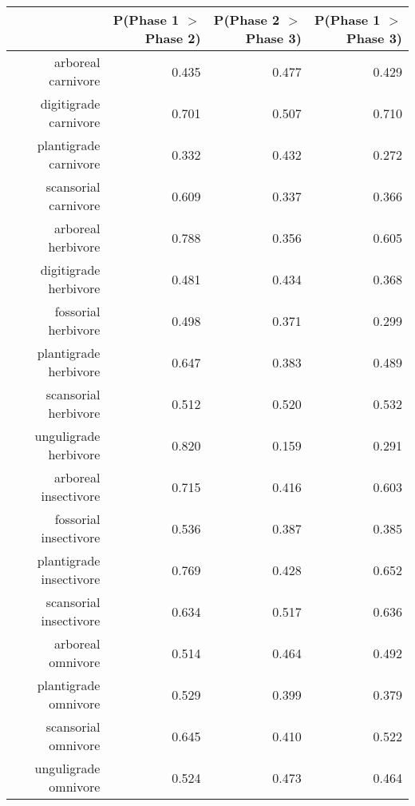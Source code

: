 \begin{table}[ht]
\centering
\begin{tabular}{rrrr}
  \hline
 & P(Phase 1 $>$ Phase 2) & P(Phase 2 $>$ Phase 3) & P(Phase 1 $>$ Phase 3) \\ 
  \hline
arboreal carnivore & 0.435 & 0.477 & 0.429 \\ 
  digitigrade carnivore & 0.701 & 0.507 & 0.710 \\ 
  plantigrade carnivore & 0.332 & 0.432 & 0.272 \\ 
  scansorial carnivore & 0.609 & 0.337 & 0.366 \\ 
  arboreal herbivore & 0.788 & 0.356 & 0.605 \\ 
  digitigrade herbivore & 0.481 & 0.434 & 0.368 \\ 
  fossorial herbivore & 0.498 & 0.371 & 0.299 \\ 
  plantigrade herbivore & 0.647 & 0.383 & 0.489 \\ 
  scansorial herbivore & 0.512 & 0.520 & 0.532 \\ 
  unguligrade herbivore & 0.820 & 0.159 & 0.291 \\ 
  arboreal insectivore & 0.715 & 0.416 & 0.603 \\ 
  fossorial insectivore & 0.536 & 0.387 & 0.385 \\ 
  plantigrade insectivore & 0.769 & 0.428 & 0.652 \\ 
  scansorial insectivore & 0.634 & 0.517 & 0.636 \\ 
  arboreal omnivore & 0.514 & 0.464 & 0.492 \\ 
  plantigrade omnivore & 0.529 & 0.399 & 0.379 \\ 
  scansorial omnivore & 0.645 & 0.410 & 0.522 \\ 
  unguligrade omnivore & 0.524 & 0.473 & 0.464 \\ 
   \hline
\end{tabular}
\label{tab:surv_plant}
\end{table}
